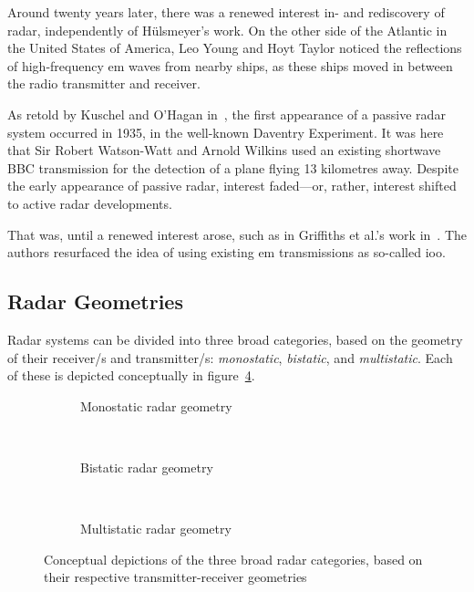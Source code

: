 \documentclass[class=report,11pt,crop=false]{standalone}
\begin{document}
Around twenty years later, there was a renewed interest in- and rediscovery of radar, independently of H\"ulsmeyer's work. On the other side of the Atlantic in the United States of America, Leo Young and Hoyt Taylor noticed the reflections of high-frequency \gls{em} waves from nearby ships, as these ships moved in between the radio transmitter and receiver.

As retold by Kuschel and O'Hagan in~\cite{kuschel-hagan-history}, the first appearance of a passive radar system occurred in 1935, in the well-known Daventry Experiment. It was here that Sir Robert Watson-Watt and Arnold Wilkins used an existing shortwave BBC transmission for the detection of a plane flying 13 kilometres away. Despite the early appearance of passive radar, interest faded---or, rather, interest shifted to active radar developments.

That was, until a renewed interest arose, such as in Griffiths et al.'s work in~\cite{Griffiths1992}. The authors resurfaced the idea of using existing \gls{em} transmissions as so-called \gls{ioo}.


\subsection{Radar Geometries}

Radar systems can be divided into three broad categories, based on the geometry of their receiver/s and transmitter/s: \emph{monostatic}, \emph{bistatic}, and \emph{multistatic}. Each of these is depicted conceptually in figure~\ref{fig:Radar_Geometry_Depictions}.

\begin{figure}[htbp]
    \centering
    \begin{subfigure}[t]{0.48\textwidth}
        \centering
        \def\svgwidth{\linewidth}
        { %
            }
        \caption{Monostatic radar geometry}
        \label{fig:Geometry_Monostatic}
    \end{subfigure}%
    ~ 
    \begin{subfigure}[t]{0.48\textwidth}
        \centering
        \def\svgwidth{\linewidth}
        { %
            }
        \caption{Bistatic radar geometry}
        \label{fig:Geometry_Bistatic}
    \end{subfigure}
    ~
    \begin{subfigure}[t]{0.6\textwidth}
        \centering
        \def\svgwidth{\linewidth}
        { %
            }
        \caption{Multistatic radar geometry}
        \label{fig:Geometry_Multistatic}
    \end{subfigure}%
    \caption{Conceptual depictions of the three broad radar categories, based on their respective transmitter-receiver geometries}
    \label{fig:Radar_Geometry_Depictions}
\end{figure}
\end{document}
